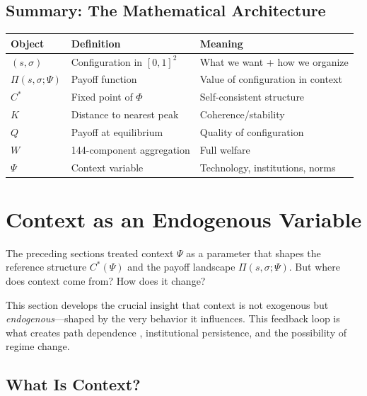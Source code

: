 \documentclass[12pt,a4paper]{article}
\begin{document}
\subsection{Summary: The Mathematical Architecture}

\begin{center}
\renewcommand{\arraystretch}{1.3}
\begin{tabular}{lll}
\hline
\textbf{Object} & \textbf{Definition} & \textbf{Meaning} \\
\hline
$(s, \sigma)$ & Configuration in $[0,1]^2$ & What we want + how we organize \\
$\Pi(s, \sigma; \Psi)$ & Payoff function & Value of configuration in context \\
$C^*$ & Fixed point of $\Phi$ & Self-consistent structure \\
$K$ & Distance to nearest peak & Coherence/stability \\
$Q$ & Payoff at equilibrium & Quality of configuration \\
$W$ & 144-component aggregation & Full welfare \\
$\Psi$ & Context variable & Technology, institutions, norms \\
\hline
\end{tabular}
\end{center}

\section{Context as an Endogenous Variable}
\label{sec:context}

The preceding sections treated context $\Psi$ as a parameter that shapes
the reference structure $C^*(\Psi)$ and the payoff landscape $\Pi(s, \sigma; \Psi)$.
But where does context come from? How does it change?

This section develops the crucial insight that context is not exogenous but
\emph{endogenous}---shaped by the very behavior it influences.
This feedback loop is what creates path dependence \citep{arthur1994}, institutional persistence,
and the possibility of regime change.

\subsection{What Is Context?}
\end{document}
